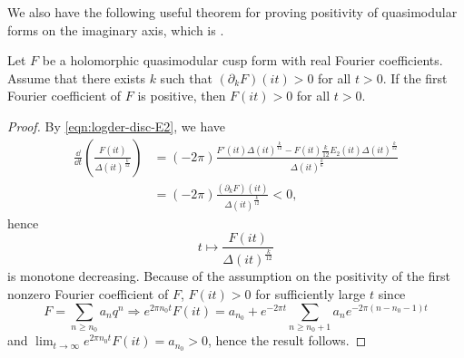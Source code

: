 We also have the following useful theorem for proving positivity of quasimodular forms on the imaginary axis, which is \cite[Proposition 3.5, Corollary 3.6]{Lee}.
\begin{theorem}\label{thm:anti-serre-der-pos}
Let $F$ be a holomorphic quasimodular cusp form with real Fourier coefficients.
Assume that there exists $k$ such that $(\partial_{k}F)(it) > 0$ for all $t > 0$.
If the first Fourier coefficient of $F$ is positive, then $F(it) > 0$ for all $t > 0$.
\end{theorem}
\begin{proof}
By \eqref{eqn:logder-disc-E2}, we have
\begin{align}
    \frac{\dd}{\dd t} \left( \frac{F(it)}{\Delta(it)^{\frac{k}{12}}}\right)
    &= (-2 \pi) \frac{F'(it) \Delta(it)^{\frac{k}{12}} - F(it) \frac{k}{12} E_{2}(it) \Delta(it)^{\frac{k}{12}}}{\Delta(it)^{\frac{k}{6}}} \\
    &= (-2 \pi) \frac{(\partial_{k} F)(it)}{\Delta(it)^{\frac{k}{12}}}  < 0,
\end{align}
hence
\[
t \mapsto \frac{F(it)}{\Delta(it)^{\frac{k}{12}}}
\]
is monotone decreasing.
Because of the assumption on the positivity of the first nonzero Fourier coefficient of $F$, $F(it) > 0$ for sufficiently large $t$ since
\[
F = \sum_{n \geq n_{0}} a_{n} q^{n} \Rightarrow e^{2 \pi n_{0} t} F(it) = a_{n_{0}} + e^{-2 \pi t}\sum_{n\geq n_{0} + 1} a_{n} e^{-2 \pi (n - n_{0} - 1)t}
\]
and $\lim_{t \to \infty} e^{2 \pi n_{0}t} F(it) = a_{n_0} > 0$, hence the result follows.
\end{proof}


